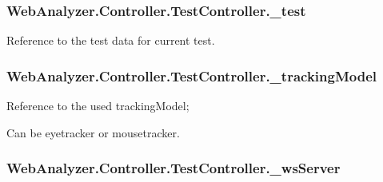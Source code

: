 \subsubsection[{\+\_\+test}]{ Web\+Analyzer.\+Controller.\+Test\+Controller.\+\_\+test\hspace{0.3cm}{\ttfamily [private]}}\label{class_web_analyzer_1_1_controller_1_1_test_controller_a6084bcc401d37f7f8861fc0e9fb771b6}


Reference to the test data for current test. 

\hypertarget{class_web_analyzer_1_1_controller_1_1_test_controller_a17ba537e2a4dc341401b513ca2afbcce}{}
\subsubsection[{\+\_\+tracking\+Model}]{ Web\+Analyzer.\+Controller.\+Test\+Controller.\+\_\+tracking\+Model\hspace{0.3cm}{\ttfamily [private]}}\label{class_web_analyzer_1_1_controller_1_1_test_controller_a17ba537e2a4dc341401b513ca2afbcce}


Reference to the used tracking\+Model; 

Can be eyetracker or mousetracker.\hypertarget{class_web_analyzer_1_1_controller_1_1_test_controller_aeb605e9f2ad9c53af52fb846fe2a98a6}{}
\subsubsection[{\+\_\+ws\+Server}]{ Web\+Analyzer.\+Controller.\+Test\+Controller.\+\_\+ws\+Server\hspace{0.3cm}{\ttfamily [private]}}\label{class_web_analyzer_1_1_controller_1_1_test_controller_aeb605e9f2ad9c53af52fb846fe2a98a6}


